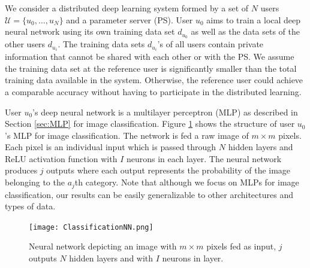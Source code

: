\documentclass[letterpaper]{article}
\begin{document}
\begin{flushleft}
{We consider a distributed deep learning system formed by a set of $N$ users $\mathcal{U}= \{u_0, \dots,u_N\}$ and
a parameter server (PS). User $u_0$ aims to train a local deep neural network using its own training data set
$d_{u_0}$ as well as the data sets of the other users $d_{u_i}$. %
The training data sets $d_{u_i}$'s of all users contain private information that cannot be shared with each other or with the PS.  We
assume the training data set at the reference user is significantly smaller  than the total training data available in the system.
Otherwise, the reference user could achieve a comparable accuracy without having to participate in the distributed learning. 

User $u_0$'s deep neural network is a multilayer perceptron (MLP) as described in Section \ref{sec:MLP} for image classification.
Figure \ref{fig:ClassNN} shows the structure of user $u_0$'s MLP for image classification. The network is fed a raw image of  $m
\times m$ pixels. Each pixel is an individual input which is passed through $N$ hidden layers and ReLU activation function with $I$
neurons in each layer. The neural network produces $j$ outputs where each output represents the probability of the image belonging to
the $a_j$th category. Note that although we focus on MLPs for image classification, our results can be easily generalizable to other
architectures and types of data. 


\begin{figure}[H]
  \centering
    \texttt{[image: ClassificationNN.png]}
    \caption[Classification neural network with input image.]{\label{fig:ClassNN} Neural network depicting an image with $m \times m$ pixels fed as input, $j$ outputs  $N$  hidden layers and with $I$ neurons in layer.}
  \end{figure}


}
\end{flushleft}
\end{document}
